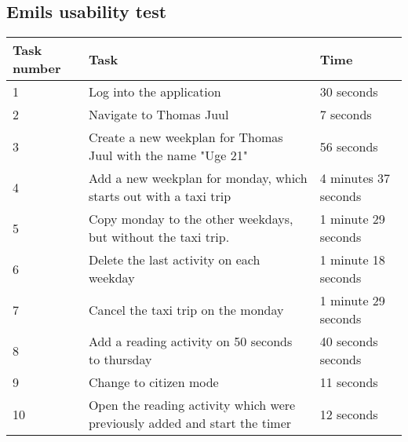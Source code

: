 \subsection{Emils usability test}\label{usability-test-14-05-emil}
\begin{table}[H]
    \small
    \begin{tabular}{|p{1.3cm}|p{10cm}|p{1.7cm}|}
    \hline
    Task number      &Task                                                                                                               & Time      \\ \hline
    1 & Log into the application                                                                                                             & 30 seconds  \\ \hline
    2 & Navigate to Thomas Juul                                                                                                         & 7 seconds  \\ \hline
    3 & Create a new weekplan for Thomas Juul with the name "Uge 21"                                                                    &  56 seconds \\ \hline
    4 & Add a new weekplan for monday, which starts out with a taxi trip                                                               & 4 minutes 37 seconds   \\ \hline
    5 & Copy monday to the other weekdays, but without the taxi trip.                                                                 & 1 minute 29 seconds   \\ \hline
    6 & Delete the last activity on each weekday                                                                                    & 1 minute 18 seconds   \\ \hline
    7 & Cancel the taxi trip on the monday                                                                                           & 1 minute 29 seconds  \\ \hline
    8 & Add a reading activity on 50 seconds to thursday                                                                           & 40 seconds seconds   \\ \hline
    9 & Change to citizen mode                                                                                                    & 11 seconds   \\ \hline
    10 & Open the reading activity which were previously added and start the timer                                                  & 12 seconds   \\ \hline

\end{tabular}
\end{table}
